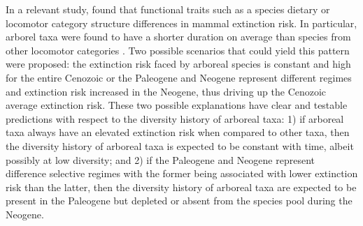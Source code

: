 \documentclass[12pt,letterpaper]{article}
\begin{document}
In a relevant study, \citet{Smits2015b} found that functional traits such as a species dietary or locomotor category structure differences in mammal extinction risk. In particular, arborel taxa were found to have a shorter duration on average than species from other locomotor categories \citep{Smits2015b}. Two possible scenarios that could yield this pattern were proposed: the extinction risk faced by arboreal species is constant and high for the entire Cenozoic or the Paleogene and Neogene represent different regimes and extinction risk increased in the Neogene, thus driving up the Cenozoic average extinction risk. These two possible explanations have clear and testable predictions with respect to the diversity history of arboreal taxa: 1) if arboreal taxa always have an elevated extinction risk when compared to other taxa, then the diversity history of arboreal taxa is expected to be constant with time, albeit possibly at low diversity; and 2) if the Paleogene and Neogene represent difference selective regimes with the former being associated with lower extinction risk than the latter, then the diversity history of arboreal taxa are expected to be present in the Paleogene but depleted or absent from the species pool during the Neogene.

\end{document}
